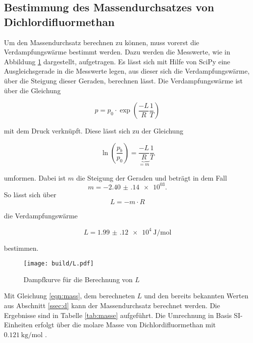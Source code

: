 \subsection{Bestimmung des Massendurchsatzes von Dichlordifluormethan}
\label{ssec:e}
Um den Massendurchsatz berechnen zu können, muss vorerst die Verdampfungswärme bestimmt werden. Dazu werden die Messwerte, wie in Abbildung \ref{fig:dampfdruck_plot} dargestellt, aufgetragen. Es lässt sich mit Hilfe von SciPy \cite{scipy} eine Ausgleichsgerade in die Messwerte legen, aus dieser sich die Verdampfungswärme, über die Steigung dieser Geraden, berechnen lässt. 
Die Verdampfungswärme ist über die Gleichung

\begin{equation}
    p = p_0 \cdot \exp{\left(\frac{-L}{R}\frac{1}{T}\right)}
    \label{eq:L}
\end{equation}

mit dem Druck verknüpft. Diese lässt sich zu der Gleichung


\begin{equation}
    \ln{\left(\frac{p_b}{p_0}\right)} = \underbrace{\frac{-L}{R}}_{=m} \frac{1}{T}
    \label{eq:L2}
\end{equation}

umformen. Dabei ist $m$ die Steigung der Geraden und beträgt in dem Fall 
\begin{equation*}
    m=\num{-2.40(14)e+03}.
\end{equation*}
So lässt sich über
\begin{equation}
    L=-m \cdot R
\end{equation}

die Verdampfungswärme 

\begin{equation*}
    L = \SI{1.99(12)e4}{\joule\per\mol}
    \label{eq:L3}
\end{equation*}

bestimmen. 

\begin{figure}
    \centering
    \texttt{[image: build/L.pdf]}
    \caption{Dampfkurve für die Berechnung von $L$}
    \label{fig:dampfdruck_plot}
\end{figure}

Mit Gleichung \eqref{eqn:mass}, dem berechneten $L$ und den bereits bekannten Werten aus Abschnitt \ref{ssec:d} kann der Massendurchsatz berechnet werden. Die Ergebnisse sind in Tabelle \ref{tab:masse} aufgeführt. Die Umrechnung in Basis SI-Einheiten erfolgt über die molare Masse von Dichlordifluormethan mit $\SI{0.121}{\kilo\g\per\mol}$ \cite{V206}.

